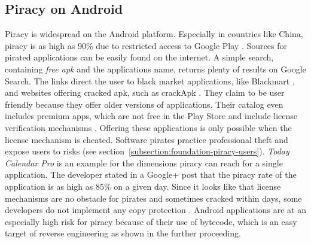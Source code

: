 \subsection{Piracy on Android} \label{subsection:foundation-piracy-android}
Piracy is widespread on the Android platform.
Especially in countries like China, piracy is as high as 90\% due to restricted access to Google Play \cite{piracyRate}.
Sources for pirated applications can be easily found on the internet.
A simple search, containing \textit{free apk} and the applications name, returns plenty of results on Google Search.
The links direct the user to black market applications, like Blackmart \cite{blackmartStore}, and websites offering cracked \gls{apk}, such as crackApk \cite{crackApk}.
They claim to be user friendly because they offer older versions of applications.
Their catalog even includes premium apps, which are not free in the Play Store and include license verification mechanisms \cite{apksfree}.
Offering these applications is only possible when the license mechanism is cheated.
Software pirates practice professional theft and expose users to risks (see section~\ref{subsection:foundation-piracy-users}).
\newline
\textit{Today Calendar Pro} is an example for the dimensions piracy can reach for a single application.
The developer stated in a Google+ post that the piracy rate of the application is as high as 85\% on a given day. \cite{xdaPiracy} \cite{developersPiracy}
Since it looks like that license mechanisms are no obstacle for pirates and sometimes cracked within days, some developers do not implement any copy protection \cite{recodeMonument}.
\newline
Android applications are at an especially high risk for piracy because of their use of bytecode, which is an easy target of reverse engineering as shown in the further proceeding.
